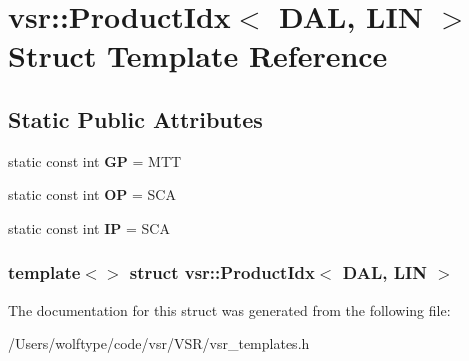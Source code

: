 \hypertarget{structvsr_1_1_product_idx_3_01_d_a_l_00_01_l_i_n_01_4}{\section{vsr\-:\-:Product\-Idx$<$ D\-A\-L, L\-I\-N $>$ Struct Template Reference}
\label{structvsr_1_1_product_idx_3_01_d_a_l_00_01_l_i_n_01_4}
}
\subsection*{Static Public Attributes}
\begin{DoxyCompactItemize}
\item 
\hypertarget{structvsr_1_1_product_idx_3_01_d_a_l_00_01_l_i_n_01_4_a471ce65eeb8b2eca0ea493b9b79176ee}{static const int {\bfseries G\-P} = M\-T\-T}\label{structvsr_1_1_product_idx_3_01_d_a_l_00_01_l_i_n_01_4_a471ce65eeb8b2eca0ea493b9b79176ee}

\item 
\hypertarget{structvsr_1_1_product_idx_3_01_d_a_l_00_01_l_i_n_01_4_ad1dbeeda41fef14951f7c0df49da949d}{static const int {\bfseries O\-P} = S\-C\-A}\label{structvsr_1_1_product_idx_3_01_d_a_l_00_01_l_i_n_01_4_ad1dbeeda41fef14951f7c0df49da949d}

\item 
\hypertarget{structvsr_1_1_product_idx_3_01_d_a_l_00_01_l_i_n_01_4_a1d5264ec9c4def7f6299f96c1b0685b3}{static const int {\bfseries I\-P} = S\-C\-A}\label{structvsr_1_1_product_idx_3_01_d_a_l_00_01_l_i_n_01_4_a1d5264ec9c4def7f6299f96c1b0685b3}

\end{DoxyCompactItemize}
\subsubsection*{template$<$$>$ struct vsr\-::\-Product\-Idx$<$ D\-A\-L, L\-I\-N $>$}



The documentation for this struct was generated from the following file\-:\begin{DoxyCompactItemize}
\item 
/\-Users/wolftype/code/vsr/\-V\-S\-R/vsr\-\_\-templates.\-h\end{DoxyCompactItemize}
